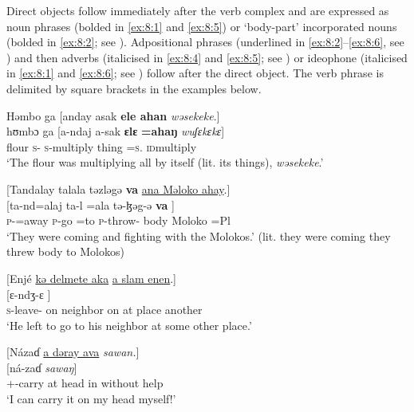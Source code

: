 Direct objects follow immediately after the verb complex and are expressed as noun phrases (bolded in \ref{ex:8:1} and \ref{ex:8:5}) or ‘body-part’ incorporated nouns (bolded in \ref{ex:8:2}; see ). Adpositional phrases (underlined in \ref{ex:8:2}--\ref{ex:8:6}, see ) and then adverbs (italicised in \ref{ex:8:4} and \ref{ex:8:5}; see ) or ideophone (italicised in \ref{ex:8:1} and \ref{ex:8:6}; see ) follow after the direct object. The verb phrase is delimited by square brackets in the examples below.

\ea \label{ex:8:1}
Həmbo  ga  [anday  asak {\textbf{ele ahan}} \textit{wəsekeke}.]\\
\gll hʊmbɔ  ga  [a-ndaj    a-sak    \textbf{ɛlɛ}  \textbf{=ahaŋ}  \textit{wuʃɛkɛkɛ}]\\
      flour  {\ADJ}  \textsc{s}-{\PRG}    \textsc{s}-multiply  thing  =\textsc{s}.{\POSS} \textsc{id}multiply\\
\glt ‘The flour was multiplying all by itself (lit. its things), \textit{wəsekeke}.’
\z

\ea \label{ex:8:2}
{}[Tandalay  talala  təzləgə   {\textbf{va}} \underline{ana Məloko ahay}.]\\
\gll  {}[ta-nd=alaj    ta-l =ala  tə-ɮəg-ə   {\textbf{va}}        ]\\
      \textsc{p}-{\PRG}=away   \textsc{p}-go =to  \textsc{p}-throw-{\CL} body  {\DAT} Moloko    =Pl\\
\glt  ‘They were coming and fighting with the Molokos.’ (lit. they were coming they threw body to Molokos)
\z

\ea \label{ex:8:3}
{}[Enjé  \underline{kə  delmete  aka}  \underline{a  slam  enen}.]\\
\gll  {}[ɛ-ndʒ{}-ɛ             ]\\
      \textsc{s}-leave-{\CL}    on  neighbor    on  at  place  another\\
\glt  ‘He left to go to his neighbor at some other place.’  
\z

\ea \label{ex:8:4}
{}[Názaɗ  \underline{a  dəray  ava}  \textit{sawan.}]\\
\gll  {}[ná-zaɗ           \textit{sawaŋ}]\\
      {\oneS}+{\IFV}-carry    at  head  in  {without help}\\
\glt  ‘I can carry it on my head myself!’
\z

